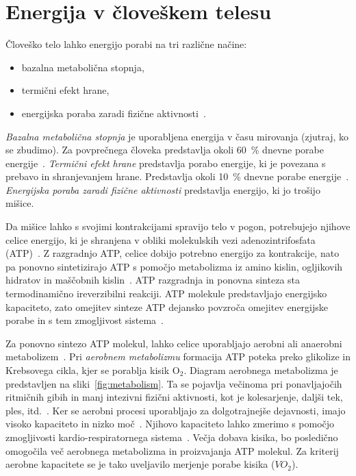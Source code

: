 \section{Energija v človeškem telesu}\label{sec:energija}
Človeško telo lahko energijo porabi na tri različne načine:

\begin{itemize}
\item bazalna metabolična stopnja,
\item termični efekt hrane,
\item energijska poraba zaradi fizične aktivnosti~\cite{levine2005measurement}.
\end{itemize}

\emph{Bazalna metabolična stopnja} je uporabljena energija v času mirovanja (zjutraj, ko se zbudimo). Za povprečnega človeka predstavlja okoli \SI{60}{\%} dnevne porabe energije~\cite{levine2005measurement}. \emph{Termični efekt hrane} predstavlja porabo energije, ki je povezana s prebavo in shranjevanjem hrane. Predstavlja okoli \SI{10}{\%} dnevne porabe energije~\cite{levine2005measurement}. \emph{Energijska poraba zaradi fizične aktivnosti} predstavlja energijo, ki jo trošijo mišice. 

Da mišice lahko s svojimi kontrakcijami spravijo telo v pogon, potrebujejo njihove celice energijo, ki je shranjena v obliki molekulskih vezi adenozintrifosfata (ATP)~\cite{scott2005misconceptions}. Z razgradnjo ATP, celice dobijo potrebno energijo za kontrakcije, nato pa ponovno sintetizirajo ATP s pomočjo metabolizma iz amino kislin, ogljikovih hidratov in maščobnih kislin~\cite{scott2005misconceptions,patel2017aerobic}. ATP razgradnja in ponovna sinteza sta termodinamično ireverzibilni reakciji.%
ATP molekule predstavljajo energijsko kapaciteto, zato omejitev sinteze ATP dejansko povzroča omejitev energijske porabe in s tem zmogljivost sistema~\cite{sahlin1998energy}. 

Za ponovno sintezo ATP molekul, lahko celice uporabljajo aerobni ali anaerobni metabolizem~\cite{scott2005misconceptions}. Pri \emph{aerobnem metabolizmu} formacija ATP poteka preko glikolize in Krebsovega cikla, kjer se porablja kisik $\mathrm{O}_2$. Diagram aerobnega metabolizma je predstavljen na sliki~\ref{fig:metabolism}. Ta se pojavlja večinoma pri ponavljajočih ritmičnih gibih in manj intezivni fizični aktivnosti, kot je kolesarjenje, daljši tek, ples, itd.~\cite{patel2017aerobic}. Ker se aerobni procesi uporabljajo za dolgotrajnejše dejavnosti, imajo visoko kapaciteto in nizko moč~\cite{sahlin1998energy}. Njihovo kapaciteto lahko zmerimo s pomočjo zmogljivosti kardio-respiratornega sistema~\cite{patel2017aerobic}. Večja dobava kisika, bo posledično omogočila več aerobnega metabolizma in proizvajanja ATP molekul. Za kriterij aerobne kapacitete se je tako uveljavilo merjenje porabe kisika (${VO}_2$).

